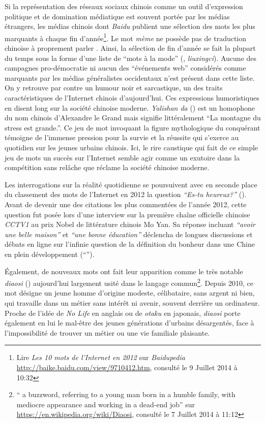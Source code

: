 Si la représentation des réseaux sociaux chinois comme un outil d'expression politique et de domination médiatique est souvent portée par les médias étrangers, les médias chinois dont \textit{Baidu} publient une sélection des mots les plus marquants à chaque fin d'année\footnote{Lire \textit{Les 10 mots de l'Internet en 2012} sur \textit{Baidupedia} \url{http://baike.baidu.com/view/9710412.htm}, consulté le 9 Juillet 2014 à 10:32}. Le mot \textit{mème} ne possède pas de traduction chinoise à proprement parler \citep{Renaud2014}. Ainsi, la sélection de fin d'année se fait la plupart du temps sous la forme d'une liste de ``mots à la mode'' (, \textit{liuxingci}). Aucune des campagnes pro-démocratie ni aucun des ``événements web'' considérés comme marquants par les médias généralistes occidentaux n'est présent dans cette liste. On y retrouve par contre un humour noir et sarcastique, un des traits caractéristiques de l'Internet chinois d'aujourd'hui. Ces expressions humoristiques en disent long sur la société chinoise moderne. \textit{Yalishan da} () est un homophone du nom chinois d'Alexandre le Grand mais signifie littéralement ``La montagne du stress est grande.''. Ce jeu de mot invoquant la figure mythologique du conquérant témoigne de l'immense pression pour la survie et la réussite qui s'exerce au quotidien sur les jeunes urbains chinois. Ici, le rire caustique qui fait de ce simple jeu de mots un succès sur l'Internet semble agir comme un exutoire dans la compétition sans relâche que réclame la société chinoise moderne. 

Les interrogations sur la réalité quotidienne se poursuivent avec en seconde place du classement des mots de l'Internet en 2012 la question \textit{``Es-tu heureux?''} (). Avant de devenir une des citations les plus commentées de l'année 2012, cette question fut posée lors d'une interview sur la première chaîne officielle chinoise \textit{CCTV1} au prix Nobel de littérature chinois Mo Yan. Sa réponse incluant \textit{``avoir une belle maison''} et \textit{``une bonne éducation''} déclencha de longues discussions et débats en ligne sur l'infinie question de la définition du bonheur dans une Chine en plein développement (``''). 

Également, de nouveaux mots ont fait leur apparition comme le très notable \textit{diaosi} () aujourd'hui largement usité dans le langage commun\footnote{`` a buzzword, referring to a young man born in a humble family, with mediocre appearance and working in a dead-end job'' sur \url{https://en.wikipedia.org/wiki/Diaosi}, consulté le 7 Juillet 2014 à 11:12}. Depuis 2010, ce mot désigne un jeune homme d'origine modeste, célibataire, sans argent ni bien, qui travaille dans un métier sans intérêt ni avenir, souvent derrière un ordinateur. Proche de l'idée de \textit{No Life} en anglais ou de \textit{otaku} en japonais, \textit{diaosi} porte également en lui le mal-être des jeunes générations d'urbains désargentés, face à l'impossibilité de trouver un métier ou une vie familiale plaisante. 

